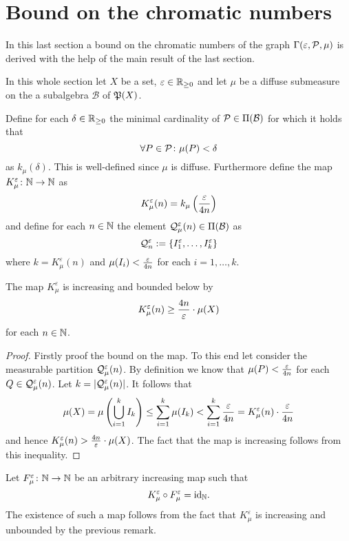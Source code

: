 \section{Bound on the chromatic numbers}\label{sec:bounds}

In this last section a bound on the chromatic numbers of the graph $\Gamma(\varepsilon, \P, \mu)$ is derived with the help of the main result of the last section.

In this whole section let $X$ be a set, $\varepsilon \in \R_{\geq 0}$ and let $\mu$ be a diffuse submeasure on the a subalgebra $\mathcal{B}$ of $\PowS(X)$.

\begin{defin}
  Define for each $\delta \in \R_{\geq 0}$ the minimal cardinality of $\P \in \Pi(\mathcal{B})$ for which it holds that \[\forall P \in \P\colon \mu(P) < \delta\] as $k_\mu(\delta)$. This is well-defined since $\mu$ is diffuse.
  Furthermore define the map $K_\mu^\varepsilon\colon \N \to \N$ as \[K_\mu^\varepsilon(n) = k_\mu\left({\varepsilon \over {4n}}\right)\] and define for each $n \in \N$ the element $\Q_\mu^\varepsilon(n) \in \Pi(\mathcal{B})$ as \[\Q_n^\varepsilon := \{I_1^\varepsilon,\ldots, I^\varepsilon_k\}\] where $k = {K_\mu^\varepsilon(n)}$ and $\mu(I_i) < {\varepsilon \over 4n}$ for each $i=1, \ldots, k$.
\end{defin}

\begin{rem}\label{rem:appr}
  The map $K_\mu^\varepsilon$ is increasing and bounded below by \[K^\varepsilon_\mu(n) \geq {4n \over \varepsilon} \cdot \mu(X)\] for each $n\in \N$.
\end{rem}


\begin{proof}
  Firstly proof the bound on the map. To this end let consider the measurable partition $\Q_\mu^\varepsilon(n)$. By definition we know that $\mu(P) <  {\varepsilon \over 4n}$ for each $Q \in \Q_\mu^\varepsilon(n)$. Let $k = |\Q_\mu^\varepsilon(n)|$.
  It follows that
  \begin{equation*}
    \mu(X) = \mu\left(\bigcup_{i=1}^k I_k\right) \leq \sum\limits_{i=1}^k \mu(I_k) < \sum\limits_{i=1}^k{\varepsilon \over 4n} = K_\mu^\varepsilon(n) \cdot {\varepsilon \over 4n}
  \end{equation*}
  and hence $K_\mu^\varepsilon(n) > {4n \over \varepsilon} \cdot \mu(X)$. The fact that the map is increasing follows from this inequality.
\end{proof}

\begin{defin}
  Let $F_\mu^\varepsilon\colon \N \to \N$ be an arbitrary increasing map such that \[K_\mu^\varepsilon \circ F_\mu^\varepsilon = \id_\N.\] The existence of such a map follows from the fact that $K_\mu^\varepsilon$ is increasing and unbounded by the previous remark.
\end{defin}

